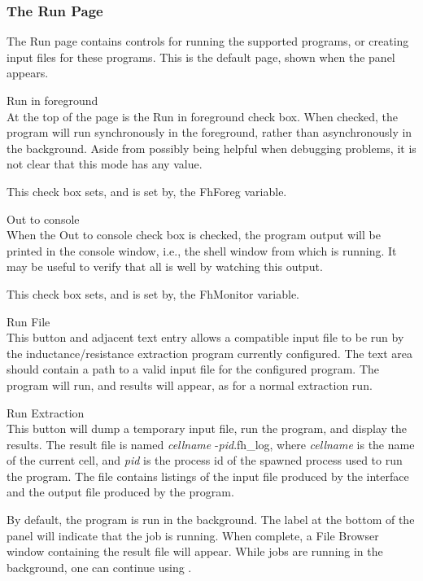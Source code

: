 \subsubsection{The Run Page}

The {\cb Run} page contains controls for running the supported
programs, or creating input files for these programs.  This is the
default page, shown when the panel appears.

\begin{description}
\item{\cb Run in foreground}\\
At the top of the page is the {\cb Run in foreground} check box.  When
checked, the program will run synchronously in the foreground, rather
than asynchronously in the background.  Aside from possibly being
helpful when debugging problems, it is not clear that this mode has
any value.

This check box sets, and is set by, the {\et FhForeg} variable.

\item{\cb Out to console}\\
When the {\cb Out to console} check box is checked, the program output
will be printed in the console window, i.e., the shell window from
which {\Xic} is running.  It may be useful to verify that all is well
by watching this output.

This check box sets, and is set by, the {\et FhMonitor} variable.

\item{\cb Run File}\\
This button and adjacent text entry allows a compatible input file
to be run by the inductance/resistance extraction program
currently configured.  The text area should contain a path to a
valid input file for the configured program.  The program will
run, and results will appear, as for a normal extraction run.

\item{\cb Run Extraction}\\
This button will dump a temporary input file, run the program, and
display the results.  The result file is named {\it cellname\/}{\vt
-}{\it pid\/}{\vt .fh\_log}, where {\it cellname} is the name of the
current cell, and {\it pid} is the process id of the spawned process
used to run the program.  The file contains listings of the input file
produced by the interface and the output file produced by the program.

By default, the program is run in the background.  The label at the
bottom of the panel will indicate that the job is running.  When
complete, a {\cb File Browser} window containing the result file will
appear.  While jobs are running in the background, one can continue
using {\Xic}.


\end{description}
